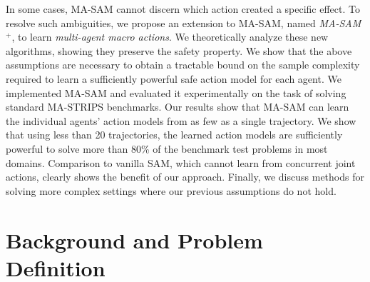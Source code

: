 \documentclass[letterpaper]{article} %
\theoremstyle{definition}
\theoremstyle{remark}
\newcommand{\sam}{\ac{SAM}\xspace}
\newcommand{\masam}{\ac{MA-SAM}\xspace}
\newcommand{\cmasam}{\textit{MA-SAM\ensuremath{^+}}\xspace}
\begin{document}
In some cases, \masam cannot discern which action created a specific effect. 
To resolve such ambiguities, we propose an extension to \masam, named \cmasam, to learn \textit{multi-agent macro actions}. 
We theoretically analyze these new algorithms, showing they preserve the safety property. 
We show that the above assumptions are necessary to obtain a tractable bound on the sample complexity required to learn a sufficiently powerful safe action model for each agent. 
We implemented \masam and evaluated it experimentally on the task of solving standard MA-STRIPS benchmarks. 
Our results show that \masam can learn the individual agents' action models from as few as a single trajectory. 
We show that using less than 20 trajectories, the learned action models are sufficiently powerful to solve more than 80\% of the benchmark test problems in most domains. 
Comparison to vanilla \sam, which cannot learn from concurrent joint actions, clearly shows the benefit of our approach. 
Finally, we discuss methods for solving more complex settings where our previous assumptions do not hold. 


\section{Background and Problem Definition}
\label{sec:background}
\end{document}

